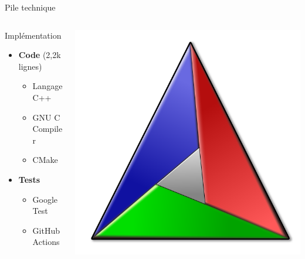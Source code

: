 \begin{frame}{Pile technique}
\begin{columns}
    \begin{column}{0.5\textwidth}
        Implémentation
        \begin{itemize}
            \item \textbf{Code} (2,2k lignes)
            \begin{itemize}
                \item Langage C++
                \item GNU C Compiler
                \item CMake
            \end{itemize}
            \item \textbf{Tests}
            \begin{itemize}
                \item Google Test
                \item GitHub Actions
            \end{itemize}
        \end{itemize}
    \end{column}
    \begin{column}{0.5\textwidth}
        \begin{center}
            
            

            \includegraphics[scale=0.1]{./images/cmake-logo.png}
        \end{center}
    \end{column}
\end{columns}
\end{frame}

